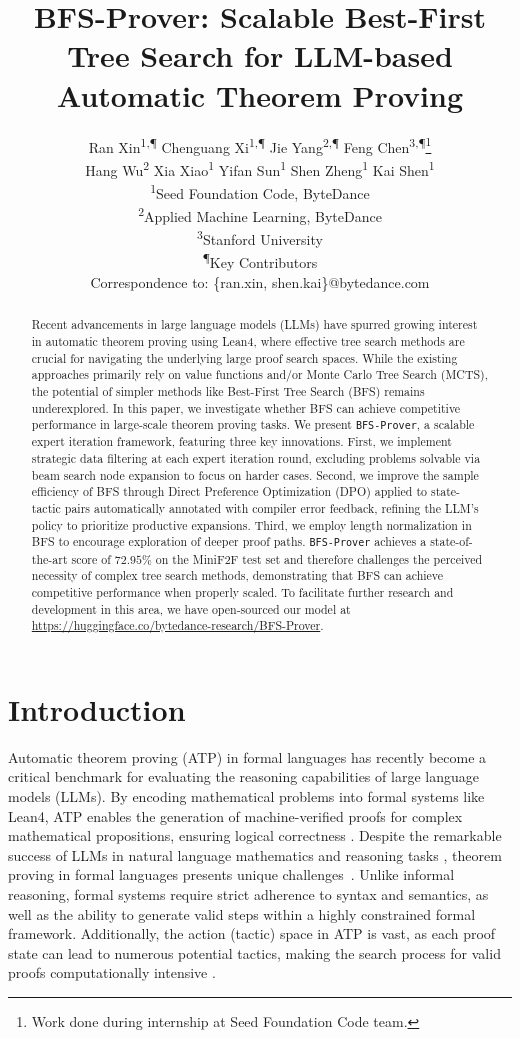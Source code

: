 \documentclass[10pt,english]{article}
\title{\textbf{BFS-Prover: Scalable Best-First Tree Search for LLM-based Automatic Theorem Proving}}
\author{
    Ran Xin\textsuperscript{1,\P} \quad 
    Chenguang Xi\textsuperscript{1,\P} \quad 
    Jie Yang\textsuperscript{2,\P} \quad 
    Feng Chen\textsuperscript{3,\P}\footnote{Work done during internship at Seed Foundation Code team.} \quad \\[0.3em]
    Hang Wu\textsuperscript{2} \quad  
    Xia Xiao\textsuperscript{1} \quad 
    Yifan Sun\textsuperscript{1} \quad 
    Shen Zheng\textsuperscript{1} \quad 
    Kai Shen\textsuperscript{1}
    \\[1.5em]
    {\textsuperscript{1}Seed Foundation Code, ByteDance} \\[0.5em]
    {\textsuperscript{2}Applied Machine Learning, ByteDance} \\[0.5em]
    {\textsuperscript{3}Stanford University} \\[0.5em]
    {\textsuperscript{\P}Key Contributors}\\[1.5em]
    {Correspondence to: \{ran.xin, shen.kai\}@bytedance.com}
}
\date{}
\begin{document}
\maketitle

\begin{abstract}
Recent advancements in large language models (LLMs) have spurred growing interest in automatic theorem proving using Lean4, where effective tree search methods are crucial for navigating the underlying large proof search spaces. While the existing approaches primarily rely on value functions and/or Monte Carlo Tree Search (MCTS), the potential of simpler methods like Best-First Tree Search (BFS) remains underexplored. In this paper, we investigate whether BFS can achieve competitive performance in large-scale theorem proving tasks. We present \texttt{BFS-Prover}, a scalable expert iteration framework, featuring three key innovations. First, we implement strategic data filtering at each expert iteration round, excluding problems solvable via beam search node expansion to focus on harder cases. Second, we improve the sample efficiency of BFS through Direct Preference Optimization (DPO) applied to state-tactic pairs automatically annotated with compiler error feedback, refining the LLM's policy to prioritize productive expansions. Third, we employ length normalization in BFS to encourage exploration of deeper proof paths. \texttt{BFS-Prover} achieves a state-of-the-art score of $72.95\%$ on the MiniF2F test set and therefore challenges the perceived necessity of complex tree search methods, demonstrating that BFS can achieve competitive performance when properly scaled. To facilitate further research and development in this area, we have open-sourced our model at \url{https://huggingface.co/bytedance-research/BFS-Prover}.
\end{abstract}

\section{Introduction}
\label{sec:intro}
Automatic theorem proving (ATP) in formal languages has recently become a critical benchmark for evaluating the reasoning capabilities of large language models (LLMs). By encoding mathematical problems into formal systems like Lean4, ATP enables the generation of machine-verified proofs for complex mathematical propositions, ensuring logical correctness \citep{moura2021lean,polu2020generative}. Despite the remarkable success of LLMs in natural language mathematics and reasoning tasks \citep{lewkowycz2022solving, openai2023gpt4}, theorem proving in formal languages presents unique challenges~\citep{ai4formal,autoformalization,bc-prover,lego-prover}. Unlike informal reasoning, formal systems require strict adherence to syntax and semantics, as well as the ability to generate valid steps within a highly constrained formal framework. Additionally, the action (tactic) space in ATP is vast, as each proof state can lead to numerous potential tactics, making the search process for valid proofs computationally intensive \citep{polu2022formal}.
\end{document}
